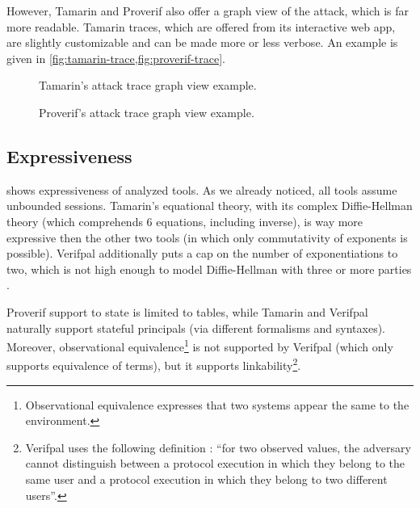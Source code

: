 \begin{figure}[t]
    \centering
    \caption{}
    \label{fig:attack-trace}
\end{figure}

However, Tamarin and Proverif also offer a graph view of the attack, which is far more readable. Tamarin traces, which are offered from its interactive web app, are slightly customizable and can be made more or less verbose. An example is given in \cref{fig:tamarin-trace,fig:proverif-trace}.


\begin{figure}[t]
    \centering
    \caption{Tamarin's attack trace graph view example.}
    \label{fig:tamarin-trace}
\end{figure}
\begin{figure}[t]
    \centering
    \caption{Proverif's attack trace graph view example.}
    \label{fig:proverif-trace}
\end{figure}


\subsection{Expressiveness}
 shows expressiveness of analyzed tools.
As we already noticed, all tools assume unbounded sessions. Tamarin's equational theory, with its complex Diffie-Hellman theory (which comprehends 6 equations, including inverse), is way more expressive then the other two tools (in which only commutativity of exponents is possible). Verifpal additionally puts a cap on the number of exponentiations to two, which is not high enough to model Diffie-Hellman with three or more parties \cite{MultipartyDH}. 

Proverif support to state is limited to tables, while Tamarin and Verifpal naturally support stateful principals (via different formalisms and syntaxes). Moreover, observational equivalence\footnote{Observational equivalence expresses that two systems appear the same to the environment.} is not supported by Verifpal (which only supports equivalence of terms), but it supports linkability\footnote{Verifpal uses the following definition \cite{VerifpalFoundations}: ``for two
observed values, the adversary cannot distinguish between a protocol execution in
which they belong to the same user and a protocol execution in which they belong to
two different users''.}.

